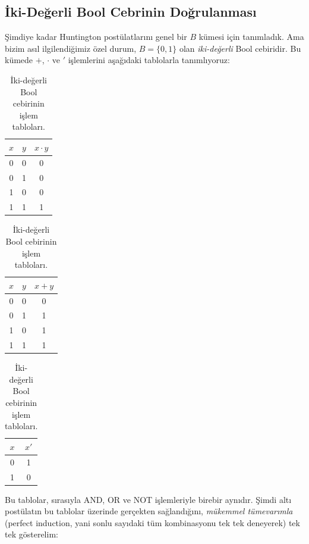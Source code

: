\subsection{İki-Değerli Bool Cebrinin Doğrulanması}
\label{sec:iki-degerli-dogrulama}

Şimdiye kadar Huntington postülatlarını genel bir $B$ kümesi için tanımladık. Ama bizim asıl
ilgilendiğimiz özel durum, $B=\{0,1\}$ olan \emph{iki-değerli} Bool cebiridir. Bu kümede $+$,
$\cdot$ ve $'$ işlemlerini aşağıdaki tablolarla tanımlıyoruz:

\begin{table}[h]
\centering
\begin{tabular}{cc|c}
\toprule
$x$ & $y$ & $x\cdot y$ \\
\midrule
0&0&0\\0&1&0\\1&0&0\\1&1&1\\
\bottomrule
\end{tabular}
\quad
\begin{tabular}{cc|c}
\toprule
$x$ & $y$ & $x+y$ \\
\midrule
0&0&0\\0&1&1\\1&0&1\\1&1&1\\
\bottomrule
\end{tabular}
\quad
\begin{tabular}{c|c}
\toprule
$x$ & $x'$ \\
\midrule
0&1\\1&0\\
\bottomrule
\end{tabular}
\caption{İki-değerli Bool cebirinin işlem tabloları.}
\label{tab:iki-degerli-tablolar}
\end{table}

Bu tablolar, sırasıyla AND, OR ve NOT işlemleriyle birebir aynıdır. Şimdi altı postülatın bu
tablolar üzerinde gerçekten sağlandığını, \emph{mükemmel tümevarımla} (perfect induction,
yani sonlu sayıdaki tüm kombinasyonu tek tek deneyerek) tek tek gösterelim:

